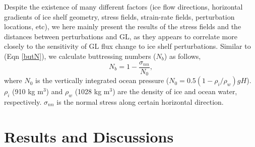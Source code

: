 \documentclass[review,oneside]{igs}
\begin{document}
Despite the existence of many different factors (ice flow directions, horizontal gradients of ice shelf geometry, stress fields, strain-rate fields, perturbation locations, etc), we here mainly present the results of the stress fields and the distances between perturbations and GL, as they appears to correlate more closely to the sensitivity of GL flux change to ice shelf perturbations. Similar to  \cite{furst2016} (Eqn \ref{butN}), we calculate buttressing numbers ($N_b$) as follows,
\begin{equation}
N_b=1-\frac{\sigma_{nn}}{N_0},
\label{butN}
\end{equation}
where $N_0$ is the vertically integrated ocean pressure ($N_0=0.5\left(1-{\rho_i}/{\rho_w}\right)gH$). $\rho_i$ (910 kg m$^3$) and $\rho_w$ (1028 kg m$^3$) are the density of ice and ocean water, respectively. $\sigma_{nn}$ is the normal stress along certain horizontal direction.

%

\section{Results and Discussions}
\end{document}
